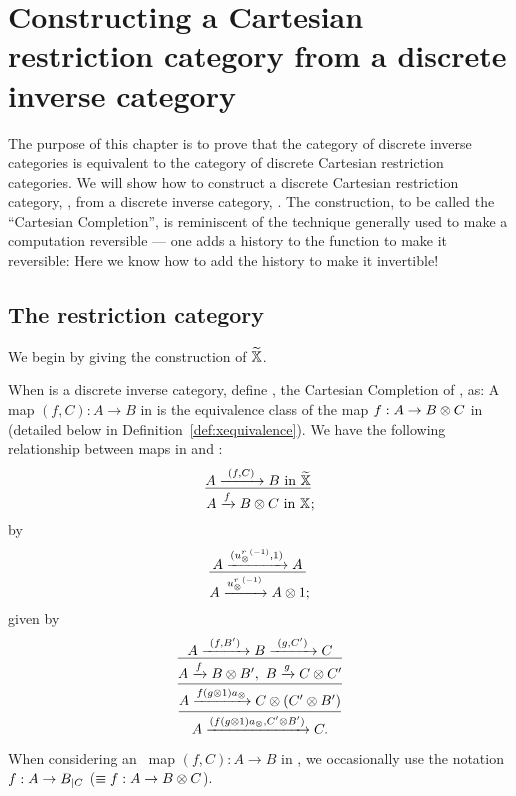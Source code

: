 \chapter{Constructing a Cartesian restriction category from a discrete inverse category} %
\label{chap:completing_a_discrete_inverse_category}

The purpose of this chapter is to prove that the category of discrete inverse categories is
equivalent to the category of discrete Cartesian restriction categories. We will show
how to construct a discrete Cartesian restriction category, \Xt, from a discrete inverse
category, \X. The construction, to be called the ``Cartesian Completion'',  is reminiscent of the
technique generally used to make a computation reversible --- one adds a history to the function to
make it reversible: Here we know how to add the history to make it invertible!

\section{The restriction category \hypXt} %
\label{sec:the_restriction_category_hypxt}


We begin by giving the construction of $\widetilde{\mathbb{X}}$.

\begin{definition}\label{def:xt}
  When \X is a discrete inverse category, define \Xt, the Cartesian Completion of \X, as:
  {
    A map $(f,C):A\to B$ in \Xt is the equivalence class of the map $f:A\to B\otimes C$ in \X (detailed below in
    Definition~\ref{def:xequivalence}). We have the following relationship between maps in \Xt and \X: %
    \[
      \infer{A\xrightarrow{f} B\*C \text{ in }\X}{A \xrightarrow{\ (f,C)\ } B \text{ in } \Xt};
    \]
  }
  {%
    by
    \[
      \infer{A\xrightarrow{\inv{u_{\*}^r}}A\* 1}
            {A \xrightarrow{(\inv{u_{\*}^r}, 1)} A};
    \]
  }
  {%
    given by
    \[
      \infer{
        \infer{
          \infer{A\xrightarrow{(f (g\*1) a_{\*},C' \* B')} C.}{A\xrightarrow{f (g\*1) a_{\*}} C \* (C' \* B')}
        }{A \xrightarrow{f} B\*B',\ B \xrightarrow{g} C\*C'}
      }{A \xrightarrow{\ (f,B')\ } B \xrightarrow{\ (g,C')\ } C}
    \]
  }

\end{definition}

When considering an \Xt\ map $(f,C):A\to B$ in \X, we occasionally use the notation $f:A\to
{B}_{|{C}}$ ($\equiv f:A\to B\otimes C$).

